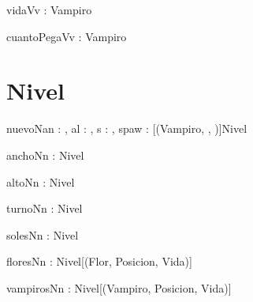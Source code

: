 \documentclass[spanish,a4paper]{article}
\begin{document}
\begin{problema}{vidaV}{v : Vampiro}{\ent}
\end{problema}

\begin{problema}{cuantoPegaV}{v : Vampiro}{\ent}
\end{problema}


\section{Nivel}


\begin{problema}{nuevoN}{an : \ent, al : \ent, s : \ent, spaw : [(Vampiro, \ent, \ent)]}{Nivel}
\end{problema}

\begin{problema}{anchoN}{n : Nivel}{\ent}
\end{problema}

\begin{problema}{altoN}{n : Nivel}{\ent}
\end{problema}


\begin{problema}{turnoN}{n : Nivel}{\ent}
\end{problema}

\begin{problema}{solesN}{n : Nivel}{\ent}
\end{problema}

\begin{problema}{floresN}{n : Nivel}{[(Flor, Posicion, Vida)]}
\end{problema}

\begin{problema}{vampirosN}{n : Nivel}{[(Vampiro, Posicion, Vida)]}
\end{problema}
\end{document}
